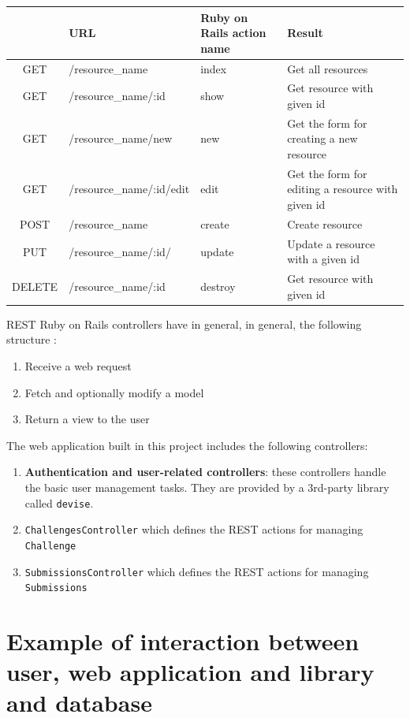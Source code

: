 \begin{tabularx}{\textwidth}{|c|X|X|X|}
    \hline
    & \textbf{URL} & \textbf{Ruby on Rails action name} & \textbf{Result} \\\hline
    GET & /resource\_name & index & Get all resources \\\hline
    GET & /resource\_name/:id & show & Get resource with given id \\\hline
    GET & /resource\_name/new & new & Get the form for creating a new resource \\\hline
    GET & /resource\_name/:id/edit & edit & Get the form for editing a resource with given id \\\hline
    POST & /resource\_name & create & Create resource \\\hline
    PUT & /resource\_name/:id/ & update & Update a resource with a given id \\\hline
    DELETE & /resource\_name/:id & destroy & Get resource with given id \\\hline
\end{tabularx}

REST Ruby on Rails controllers have in general, in general, the following structure \citep{RoRDocumentation}:
\begin{enumerate}
    \item Receive a web request
    \item Fetch and optionally modify a model
    \item Return a view to the user
\end{enumerate}

The web application built in this project includes the following controllers:
\begin{enumerate}
    \item \textbf{Authentication and user-related controllers}: these controllers handle the basic user management tasks. They are provided by a 3rd-party library called \texttt{devise}.
    \item \texttt{ChallengesController} which defines the REST actions for managing \texttt{Challenge}
    \item \texttt{SubmissionsController} which defines the REST actions for managing \texttt{Submissions}

\end{enumerate}

\section{Example of interaction between user, web application and library and database}

